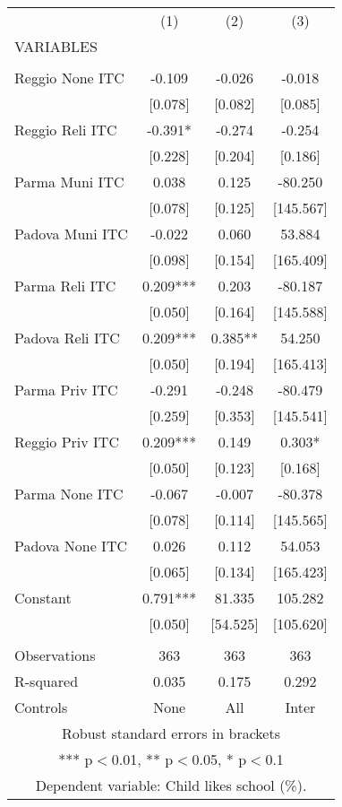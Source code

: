\begin{tabular}{lccc} \hline
 & (1) & (2) & (3) \\
VARIABLES &  &  &  \\ \hline
 &  &  &  \\
Reggio None ITC & -0.109 & -0.026 & -0.018 \\
 & [0.078] & [0.082] & [0.085] \\
Reggio Reli ITC & -0.391* & -0.274 & -0.254 \\
 & [0.228] & [0.204] & [0.186] \\
Parma Muni ITC & 0.038 & 0.125 & -80.250 \\
 & [0.078] & [0.125] & [145.567] \\
Padova Muni ITC & -0.022 & 0.060 & 53.884 \\
 & [0.098] & [0.154] & [165.409] \\
Parma Reli ITC & 0.209*** & 0.203 & -80.187 \\
 & [0.050] & [0.164] & [145.588] \\
Padova Reli ITC & 0.209*** & 0.385** & 54.250 \\
 & [0.050] & [0.194] & [165.413] \\
Parma Priv ITC & -0.291 & -0.248 & -80.479 \\
 & [0.259] & [0.353] & [145.541] \\
Reggio Priv ITC & 0.209*** & 0.149 & 0.303* \\
 & [0.050] & [0.123] & [0.168] \\
Parma None ITC & -0.067 & -0.007 & -80.378 \\
 & [0.078] & [0.114] & [145.565] \\
Padova None ITC & 0.026 & 0.112 & 54.053 \\
 & [0.065] & [0.134] & [165.423] \\
Constant & 0.791*** & 81.335 & 105.282 \\
 & [0.050] & [54.525] & [105.620] \\
 &  &  &  \\
Observations & 363 & 363 & 363 \\
R-squared & 0.035 & 0.175 & 0.292 \\
 Controls & None & All & Inter \\ \hline
\multicolumn{4}{c}{ Robust standard errors in brackets} \\
\multicolumn{4}{c}{ *** p$<$0.01, ** p$<$0.05, * p$<$0.1} \\
\multicolumn{4}{c}{ Dependent variable: Child likes school (\%).} \\
\end{tabular}
